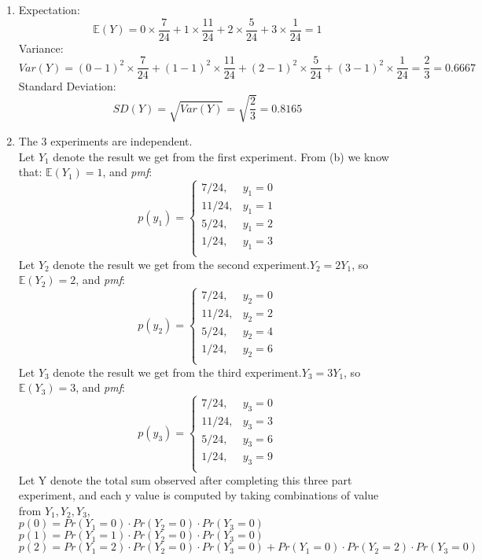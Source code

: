 \documentclass[11pt]{article}
\begin{document}
\begin{enumerate}[label=\textbf{Question \arabic*:},start=1]
\begin{enumerate}
\item Expectation:
\[
\mathbb{E}(Y) = 0 \times \frac{7}{24} + 1 \times \frac{11}{24} + 2 \times \frac{5}{24} + 3 \times \frac{1}{24} = 1
\]
Variance:
\[
Var(Y) = (0 - 1)^2 \times \frac{7}{24} + (1 - 1)^2 \times \frac{11}{24} + (2 - 1)^2 \times \frac{5}{24} + (3 - 1)^2 \times \frac{1}{24} = \frac{2}{3} = 0.6667
\]
Standard Deviation:
\[
SD(Y) = \sqrt{Var(Y)} = \sqrt{\frac{2}{3}} = 0.8165
\]


\item The 3 experiments are independent.\\
Let \(Y_1\) denote the result we get from the first experiment. From (b) we know that: $\mathbb{E}(Y_1) = 1$, and \textit{pmf}:
\[
    p(y_1) = \begin{cases}
        7/24, & y_1 = 0\\
        11/24, & y_1 = 1\\
        5/24, & y_1 = 2\\
        1/24 , & y_1 = 3\\
        \end{cases}
\]
Let \(Y_2\) denote the result we get from the second experiment.\(Y_2 = 2 Y_1\), so $\mathbb{E}(Y_2) = 2$, and \textit{pmf}:
\[
    p(y_2) = \begin{cases}
        7/24, & y_2 = 0\\
        11/24, & y_2 = 2\\
        5/24, & y_2 = 4\\
        1/24 , & y_2 = 6\\
        \end{cases}
\]
Let \(Y_3\) denote the result we get from the third experiment.\(Y_3 = 3 Y_1\), so $\mathbb{E}(Y_3) = 3$, and \textit{pmf}:
\[
    p(y_3) = \begin{cases}
        7/24, & y_3 = 0\\
        11/24, & y_3 = 3\\
        5/24, & y_3 = 6\\
        1/24 , & y_3 = 9\\
        \end{cases}
\]
Let Y denote the total sum observed after completing this three part experiment, and each y value is computed by taking combinations of value from $Y_1, Y_2, Y_3$,\\
$p(0) = Pr(Y_1=0) \cdot Pr(Y_2=0) \cdot Pr(Y_3=0)$\\
$p(1) = Pr(Y_1=1) \cdot Pr(Y_2=0) \cdot Pr(Y_3=0)$\\
$p(2) = Pr(Y_1=2) \cdot Pr(Y_2=0) \cdot Pr(Y_3=0) + Pr(Y_1=0) \cdot Pr(Y_2=2) \cdot Pr(Y_3=0)$\\

\end{enumerate}
\end{enumerate}
\end{document}
